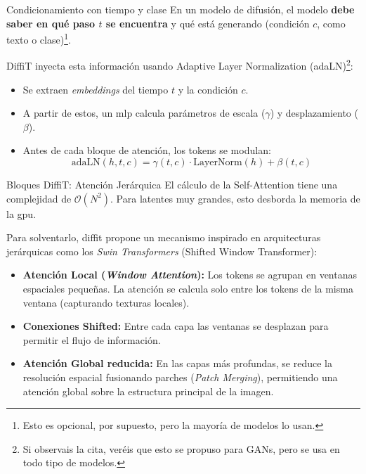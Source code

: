 \begin{frame}{Condicionamiento con tiempo y clase}
En un modelo de difusión, el modelo \textbf{debe saber en qué paso $t$ se encuentra} y qué está generando (condición $c$, como texto o clase)\footnote{Esto es opcional, por supuesto, pero la mayoría de modelos lo usan.}.

DiffiT inyecta esta información usando \alert{Adaptive Layer Normalization (adaLN)}\cite{karras2020analyzing}\footnote{Si observais la cita, veréis que esto se propuso para GANs, pero se usa en todo tipo de modelos.}:

\begin{itemize}
    \item Se extraen \textit{embeddings} del tiempo $t$ y la condición $c$.
    \item A partir de estos, un \gls{mlp} calcula parámetros de escala ($\gamma$) y desplazamiento ($\beta$).
    \item Antes de cada bloque de atención, los tokens se modulan: 
    $$ \text{adaLN}(h, t, c) = \gamma(t, c) \cdot \text{LayerNorm}(h) + \beta(t, c) $$
\end{itemize}
\end{frame}

\begin{frame}{Bloques DiffiT: Atención Jerárquica}
El cálculo de la \alert{Self-Attention} tiene una complejidad de $\mathcal{O}(N^2)$. Para latentes muy grandes, esto desborda la memoria de la \gls{gpu}.

Para solventarlo, \gls{diffit} propone un mecanismo inspirado en arquitecturas jerárquicas como los \textit{Swin Transformers} (Shifted Window Transformer):
\begin{itemize}
    \item \textbf{Atención Local (\textit{Window Attention}):} Los tokens se agrupan en ventanas espaciales pequeñas. La atención se calcula solo entre los tokens de la misma ventana (capturando texturas locales).
    \item \textbf{Conexiones Shifted:} Entre cada capa las ventanas se desplazan para permitir el flujo de información.
    \item \textbf{Atención Global reducida:} En las capas más profundas, se reduce la resolución espacial fusionando parches (\textit{Patch Merging}), permitiendo una atención global sobre la estructura principal de la imagen.
\end{itemize}
\end{frame}

